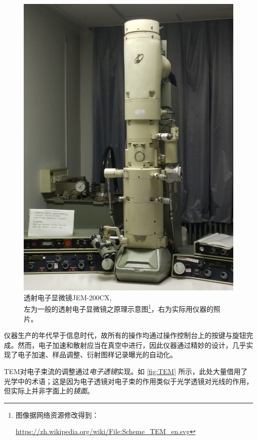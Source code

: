 \documentclass[aps,pre,12pt,preprint,%
	onecolumn,showpacs,showkeys,nofootinbib]{revtex4-2}
\begin{document}
\begin{figure}[!ht]
	\includegraphics[height=\TEMfigHeight]{RealTEM}
	\caption[透射电子显微镜]{透射电子显微镜\textup{JEM-200CX}, \\
		左为一般的透射电子显微镜之原理示意图\footnote{%
			图像据网络资源修改得到：\par
			\noindent%
			\url{https://zh.wikipedia.org/wiki/File:Scheme_TEM_en.svg}%
		}，右为实际用仪器的照片。
		\vspace{1ex}}
	\label{fig:TEM}
	\end{figure}
	
	仪器生产的年代早于信息时代，故所有的操作均通过操作控制台上的按键与旋钮完成。然而，电子加速和散射应当在真空中进行，因此仪器通过精妙的设计，几乎实现了电子加速、样品调整、衍射图样记录曝光的自动化。
	
	TEM对电子束流的调整通过\textit{电子透镜}实现。如 \autoref{fig:TEM} 所示，此处大量借用了光学中的术语；这是因为电子透镜对电子束的作用类似于光学透镜对光线的作用，但实际上并非字面上的\textit{镜面}。
	
\end{document}

